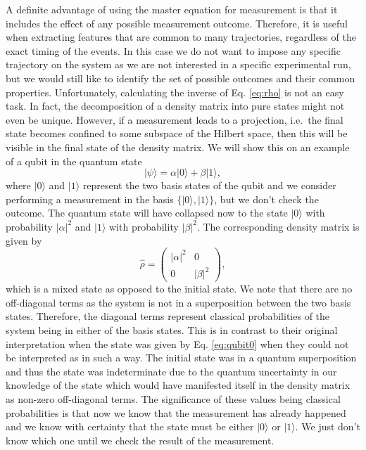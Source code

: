 A definite advantage of using the master equation for measurement is
that it includes the effect of any possible measurement
outcome. Therefore, it is useful when extracting features that are
common to many trajectories, regardless of the exact timing of the
events. In this case we do not want to impose any specific trajectory
on the system as we are not interested in a specific experimental run,
but we would still like to identify the set of possible outcomes and
their common properties. Unfortunately, calculating the inverse of
Eq. \eqref{eq:rho} is not an easy task. In fact, the decomposition of
a density matrix into pure states might not even be unique. However,
if a measurement leads to a projection, i.e.~the final state becomes
confined to some subspace of the Hilbert space, then this will be
visible in the final state of the density matrix. We will show this on
an example of a qubit in the quantum state
\begin{equation}
  \label{eq:qubit0}
  | \psi \rangle = \alpha |0 \rangle + \beta | 1 \rangle,
\end{equation}
where $| 0 \rangle$ and $| 1 \rangle$ represent the two basis states
of the qubit and we consider performing a measurement in the basis
$\{| 0 \rangle, | 1 \rangle \}$, but we don't check the outcome.  The
quantum state will have collapsed now to the state $ | 0 \rangle$ with
probability $| \alpha |^2$ and $| 1 \rangle$ with probability
$| \beta |^2$. The corresponding density matrix is given by
\begin{equation}
  \label{eq:rho1}
  \hat{\rho} = \left( \begin{array}{cc}
                        | \alpha |^2 & 0 \\
                        0 & |\beta|^2 
                      \end{array} \right),
\end{equation}
which is a mixed state as opposed to the initial state. We note that
there are no off-diagonal terms as the system is not in a
superposition between the two basis states. Therefore, the diagonal
terms represent classical probabilities of the system being in either
of the basis states. This is in contrast to their original
interpretation when the state was given by Eq. \eqref{eq:qubit0} when
they could not be interpreted as in such a way. The initial state was
in a quantum superposition and thus the state was indeterminate due to
the quantum uncertainty in our knowledge of the state which would have
manifested itself in the density matrix as non-zero off-diagonal
terms. The significance of these values being classical probabilities
is that now we know that the measurement has already happened and we
know with certainty that the state must be either $| 0 \rangle$ or
$| 1 \rangle$. We just don't know which one until we check the result
of the measurement.

